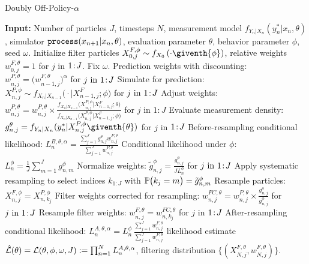 \documentclass{article}
\begin{document}
\begin{algorithm}[ht]
\centering
	\caption{Doubly Off-Policy-$\alpha$}
    \label{alg:dop}
	\begin{algorithmic}[1]
	     \STATE \textbf{Input:} Number of particles $J$, timesteps $N$, measurement model $f_{Y_n|X_n}(y_n^*|x_n, \theta)$, simulator $\texttt{process}(x_{n+1}|x_n, \theta)$, evaluation parameter $\theta$, behavior parameter $\phi$, seed $\omega$.
		\STATE Initialize filter particles ${X}_{0,j}^{F,\phi}\sim {f}_{{X}_{0}}\left(\cdot\giventh{\phi}\right)$, relative weights $w^{F,\theta}_{0,j}= 1$ for $j$ in ${1}\!:\!{J}$. Fix $\omega.$
            \STATE Prediction weights with discounting: $w_{n,j}^{P,\theta} = \big(w_{n-1,j}^{F,\theta}\big)^\alpha$ for $j\ \mathrm{in}\ {1}\!:\!{J}$
            \label{dop-alpha:discount}
            \STATE Simulate for prediction:
            ${X}_{n,j}^{P,\phi}\sim {f}_{{X}_{n}|{X}_{n-1}}\big(\cdot|{X}_{n-1,j}^{F};{\phi}\big)$ for $j\ \mathrm{in}\ {1}\!:\!{J}$ \label{dop-alpha:step1}
            \STATE Adjust weights: $\displaystyle w_{n,j}^{P,\theta} = w_{n,j}^{P,\theta} \times
            \frac{{f}_{{X}_{n}|{X}_{n-1}}\big({X}_{n,j}^{P,\phi}|{X}_{n-1,j}^{F};{\theta}\big)}{{f}_{{X}_{n}|{X}_{n-1}}\big({X}_{n,j}^{P,\phi}|{X}_{n-1,j}^{F};{\phi}\big)}$ for $j$ in $1:J$
            \label{dop-alpha:dproc}
            \STATE Evaluate measurement density:
            $g^{\theta}_{n,j}={f}_{{Y}_{n}|{X}_{n}}(y_{n}^{*}|{X}_{n,j}^{P,\phi}\giventh{\theta})$ for $j$ in ${1}\!:\!{J}$
            \STATE Before-resampling conditional likelihood: $\displaystyle L_n^{B,\theta,\alpha} = \frac{\sum_{j=1}^Jg^\theta_{n,j} w^{P,\theta}_{n,j}}{\sum_{j=1}^J  w^{P,\theta}_{n,j}}$
            \STATE Conditional likelihood under $\phi$: 
            $L_n^{\phi} = \frac{1}{J}\sum_{m=1}^{J}g^{\phi}_{n,m}$
            \label{dop-alpha:Lphi}
            \STATE Normalize weights:
            $\displaystyle \tilde{g}^{\phi}_{n,j}= \frac{g^{\phi}_{n,j}}{JL_n^{\phi}}$
            for $j\ \mathrm{in}\ {1}\!:\!{J}$
            \STATE Apply systematic resampling to select indices $k_{1:J}$ with $\mathbb{P}\big(k_{j}=m\big) =\tilde{g}^{\phi}_{n,m}$ \label{dop-alpha:systematic}
            \STATE Resample particles: ${X}_{n,j}^{F,\phi}={X}_{n,k_{j}}^{P,\phi}$
            \STATE Filter weights corrected for resampling:
            $\displaystyle w^{FC,\theta}_{n,j}= w^{P,\theta}_{n,j} \times \frac{ g^{\theta}_{n,j}}{ g^{\phi}_{n,j}}$ for $j\ \mathrm{in}\ {1}\!:\!{J}$ \label{dop-alpha:weight:update}
            \STATE Resample filter weights:
            $w_{n,j}^{F,\theta}= {w}_{n,k_{j}}^{FC,\theta}$
            for $j$ in ${1}\!:\!{J}$ \label{dop-alpha:step2}
            \STATE After-resampling conditional likelihood: $\displaystyle L_n^{A,\theta,\alpha} = L_n^\phi \, \frac{\sum_{j=1}^J w^{F,\theta}_{n,j}}{\sum_{j=1}^J  w^{P,\theta}_{n,j}}$
            \ENDFOR
		\RETURN likelihood estimate $\hat{\mathcal{L}}(\theta) = \mathcal{L}(\theta, \phi, \omega, J) := \prod_{n=1}^N L_n^{A,\theta,\alpha}$, filtering distribution $\{(X_{N,j}^{F, \theta}, w^{F,\theta}_{N,j})\}.$
	\end{algorithmic}
\end{algorithm}
\end{document}
